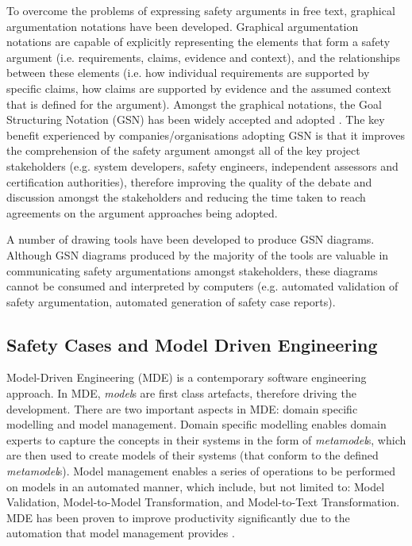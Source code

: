 To overcome the problems of expressing safety arguments in free text, graphical argumentation notations have been developed. 
Graphical argumentation notations are capable of explicitly representing the elements that form a safety argument (i.e. requirements, claims, evidence and context), and the relationships between these elements (i.e. how individual requirements are supported by specific claims, how claims are supported by evidence and the assumed context that is defined for the argument). 
Amongst the graphical notations, the Goal Structuring Notation (GSN) \cite{kelly2004goal} has been widely accepted and adopted \cite{chinneck2004turning}. 
The key benefit experienced by companies/organisations adopting GSN is that it improves the comprehension of the safety argument amongst all of the key project stakeholders (e.g. system developers, safety engineers, independent assessors and certification authorities), therefore improving the quality of the debate and discussion amongst the stakeholders and reducing the time taken to reach agreements on the argument approaches being adopted.

A number of drawing tools have been developed \cite{asce, iscade, yorkgsn, certWare, astahGSN} to produce GSN diagrams. 
Although GSN diagrams produced by the majority of the tools are valuable in communicating safety argumentations amongst stakeholders, these diagrams cannot be consumed and interpreted by computers (e.g. automated validation of safety argumentation, automated generation of safety case reports). 


\subsection{Safety Cases and Model Driven Engineering}
Model-Driven Engineering (MDE) is a contemporary software engineering approach. 
In MDE, \textit{model}s are first class artefacts, therefore driving the development. 
There are two important aspects in MDE: domain specific modelling and model management. 
Domain specific modelling enables domain experts to capture the concepts in their systems in the form of \textit{metamodel}s, which are then used to create models of their systems (that conform to the defined \textit{metamodel}s). 
Model management enables a series of operations to be performed on models in an automated manner, which include, but not limited to: Model Validation, Model-to-Model Transformation, and Model-to-Text Transformation.
MDE has been proven to improve productivity significantly due to the automation that model management provides \cite{jaaksi2002developing, karna2009evaluating}. 

